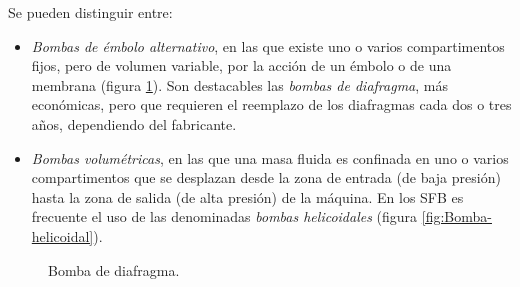 Se pueden distinguir entre:
\begin{itemize}
\item \emph{Bombas de émbolo alternativo}, en las que existe uno o varios
compartimentos fijos, pero de volumen variable, por la acción de un
émbolo o de una membrana (figura \ref{fig:Bomba-de-diafragma}). Son
destacables las \emph{bombas de diafragma}, más económicas, pero que
requieren el reemplazo de los diafragmas cada dos o tres años, dependiendo
del fabricante.
\item \emph{Bombas volumétricas}, en las que una masa fluida es confinada
en uno o varios compartimentos que se desplazan desde la zona de entrada
(de baja presión) hasta la zona de salida (de alta presión) de la
máquina. En los SFB es frecuente el uso de las denominadas \emph{bombas
helicoidales} (figura \ref{fig:Bomba-helicoidal}).
\end{itemize}
%
\begin{figure}
\begin{centering}
\hfill{}\hfill{}\hfill{}
\par\end{centering}

\caption{Bomba de diafragma.\label{fig:Bomba-de-diafragma}}

\end{figure}


